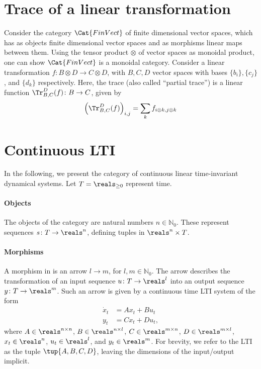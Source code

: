 
\section{Trace of a linear transformation}
Consider the category $\Cat{FinVect}$ of finite dimensional vector spaces, which has as objects finite dimensional vector spaces and as morphisms linear maps between them. Using the tensor product $\otimes$ of vector spaces as monoidal product, one can show $\Cat{FinVect}$ is a monoidal category. Consider a linear transformation $f\colon B\otimes D\to C\otimes D$, with $B,C,D$ vector spaces with bases $\{b_i\},\{c_j\}$, and $\{d_k\}$ respectively. Here, the trace (also called ``partial trace'') is a linear function $\Tr_{B,C}
^D(f)\colon B\to C$, given by
\begin{equation}
  \left(\Tr_{B,C}
  ^D(f) \right)_{i,j}=\sum_{k}f_{i\otimes k,j\otimes k}
\end{equation}


\section{Continuous LTI}
In the following, we present the category of continuous linear time-invariant dynamical systems. Let $T=\reals_{\geq 0}$ represent time.

\paragraph{Objects} The objects of the category are natural numbers $n\in \mathbb{N}_0$. These represent sequences $s\colon T\to \reals^n$, defining tuples in $\reals^n\times T$.

\paragraph{Morphisms} A morphism in  is an arrow $l\to m$, for $l,m\in \mathbb{N}_0$. The arrow describes the transformation of an input sequence $u\colon T\to \reals^l$ into an output sequence $y\colon T\to \reals^m$. Such an arrow is given by a continuous time LTI system of the form
\begin{equation}
  \begin{aligned}
    \dot{x}_t&=A x_t+B u_t\\
    y_t&=C x_t +D u_t,
  \end{aligned}
\end{equation}
where $A\in \reals^{n\times n}$, $B\in \reals^{n\times l}$, $C\in \reals^{m\times n}$, $D\in \reals^{m\times l}$, $x_t\in \reals^n$, $u_t\in \reals^l$, and $y_t\in \reals^m$. For brevity, we refer to the LTI as the tuple $\tup{A,B,C,D}$, leaving the dimensions of the input/output implicit.

